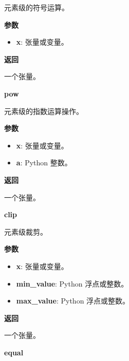 元素级的符号运算。

\textbf{参数}

\begin{itemize}
\tightlist
\item
  \textbf{x}: 张量或变量。
\end{itemize}

\textbf{返回}

一个张量。


\textbf{pow}\label{pow}

\begin{Shaded}
\begin{Highlighting}[]
\end{Highlighting}
\end{Shaded}

元素级的指数运算操作。

\textbf{参数}

\begin{itemize}
\tightlist
\item
  \textbf{x}: 张量或变量。
\item
  \textbf{a}: Python 整数。
\end{itemize}

\textbf{返回}

一个张量。


\textbf{clip}\label{clip}

\begin{Shaded}
\begin{Highlighting}[]
\end{Highlighting}
\end{Shaded}

元素级裁剪。

\textbf{参数}

\begin{itemize}
\tightlist
\item
  \textbf{x}: 张量或变量。
\item
  \textbf{min\_value}: Python 浮点或整数。
\item
  \textbf{max\_value}: Python 浮点或整数。
\end{itemize}

\textbf{返回}

一个张量。


\textbf{equal}\label{equal}

\begin{Shaded}
\begin{Highlighting}[]
\end{Highlighting}
\end{Shaded}

